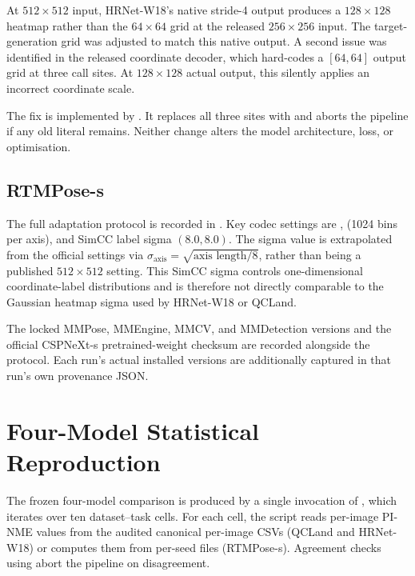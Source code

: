 At $512 \times 512$ input, HRNet-W18's native stride-4 output
produces a $128 \times 128$ heatmap rather than the $64 \times 64$
grid at the released $256 \times 256$ input. The target-generation
grid was adjusted to match this native output. A second issue was
identified in the released coordinate decoder, which hard-codes a
$[64, 64]$ output grid at three call sites. At $128 \times 128$
actual output, this silently applies an incorrect coordinate scale.

The fix is implemented by
. It replaces all three
sites with  and aborts the
pipeline if any old literal remains. Neither change
alters the model architecture, loss, or optimisation.


\subsection{RTMPose-s}
\label{app:rtmpose-reproduction}

The full adaptation protocol is recorded in
. Key codec
settings are ,
 (1024 bins per axis), and SimCC
label sigma $(8.0,8.0)$. The sigma value is extrapolated from the
official settings via
$\sigma_{\text{axis}}=\sqrt{\text{axis length}/8}$, rather than being
a published $512 \times 512$ setting. This SimCC sigma controls
one-dimensional coordinate-label distributions and is therefore not
directly comparable to the Gaussian heatmap sigma used by HRNet-W18
or QCLand.

The locked MMPose, MMEngine, MMCV, and MMDetection versions and the
official CSPNeXt-s pretrained-weight checksum are recorded alongside
the protocol. Each run's actual installed versions are additionally
captured in that run's own provenance JSON.



\section{Four-Model Statistical Reproduction}
\label{app:paired-stats}

The frozen four-model comparison is produced by a single invocation
of , which iterates over
ten dataset--task cells. For each cell, the script reads per-image
PI-NME values from the audited canonical per-image CSVs (QCLand and
HRNet-W18) or computes them from per-seed files (RTMPose-s).
Agreement checks using 
abort the pipeline on disagreement.

